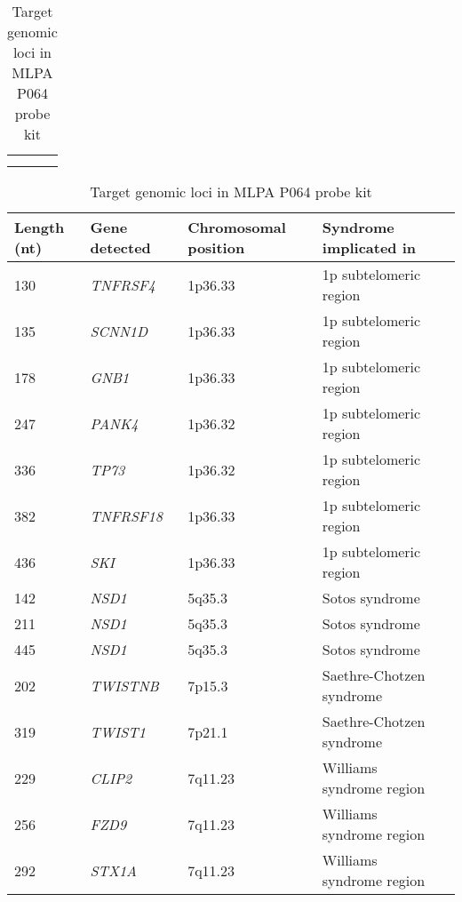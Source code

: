 \begin{table}[]
\centering
\begin{tabular}{c|c}
 &  \\
 & 
\end{tabular}
\caption{Target genomic loci in MLPA P064 probe kit}
\label{tab:my_label}

\begin{tabular}{ | l | l | l | l | l | }
\hline
Length  (nt) & Gene detected & Chromosomal position & Syndrome implicated in   \\* \midrule
130          & \textit{TNFRSF4}       & 1p36.33              & 1p subtelomeric region   \\* \midrule
135          & \textit{SCNN1D}        & 1p36.33              & 1p subtelomeric region   \\* \midrule
178          & \textit{GNB1}          & 1p36.33              & 1p subtelomeric region   \\* \midrule
247          & \textit{PANK4}         & 1p36.32              & 1p subtelomeric region   \\* \midrule
336          & \textit{TP73}          & 1p36.32              & 1p subtelomeric region   \\* \midrule
382          & \textit{TNFRSF18}      & 1p36.33              & 1p subtelomeric region   \\* \midrule
436          & \textit{SKI}           & 1p36.33              & 1p subtelomeric region   \\* \midrule
142          & \textit{NSD1}          & 5q35.3               & Sotos syndrome           \\* \midrule
211          & \textit{NSD1}          & 5q35.3               & Sotos syndrome           \\* \midrule
445          & \textit{NSD1}          & 5q35.3               & Sotos syndrome           \\* \midrule
202          & \textit{TWISTNB}       & 7p15.3               & Saethre-Chotzen syndrome \\* \midrule
319          & \textit{TWIST1}        & 7p21.1               & Saethre-Chotzen syndrome \\* \midrule
229          & \textit{CLIP2}         & 7q11.23              & Williams syndrome region \\* \midrule
256          & \textit{FZD9}          & 7q11.23              & Williams syndrome region \\* \midrule
292          & \textit{STX1A}         & 7q11.23              & Williams syndrome region \\* \midrule

\end{tabular}
\end{table}
